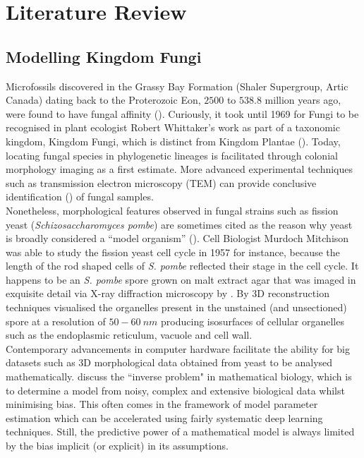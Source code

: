 \chapter{Literature Review}

\section{Modelling Kingdom Fungi}

Microfossils discovered in the Grassy Bay Formation 
(Shaler Supergroup, Artic Canada) dating back to the Proterozoic Eon, $2500$ to $538.8$ million years ago, were 
found to have fungal affinity (\cite{loron2019early}). Curiously, it took until 1969 for Fungi to be 
recognised in plant ecologist Robert Whittaker's work as part of a taxonomic kingdom, Kingdom Fungi,
which is distinct from Kingdom Plantae (\cite{whittaker1969new}). Today, locating fungal species 
in phylogenetic lineages is facilitated through colonial morphology imaging as a first 
estimate. More advanced experimental techniques such as transmission 
electron microscopy (TEM) can provide  
conclusive identification (\cite{loron2019early}) of fungal samples.
\\

Nonetheless, morphological features observed in fungal strains such as fission yeast 
(\textit{Schizosaccharomyces pombe}) are sometimes cited as the reason 
why yeast is broadly considered a ``model organism'' (\cite{hayles2018introduction}).
Cell Biologist Murdoch Mitchison was able to study the fission yeast cell cycle in 1957 for instance,
because the length of the rod shaped cells of \textit{S. pombe} reflected their stage in the cell cycle.
It happens to be an \textit{S. pombe} spore grown on malt extract agar that was imaged in exquisite detail via 
X-ray diffraction microscopy by \cite{jiang2010quantitative}. By 3D 
reconstruction techniques \cite{jiang2010quantitative} visualised the organelles
present in the unstained (and unsectioned) spore at a resolution of $50-60 \ nm$ 
producing isosurfaces of cellular organelles such as the endoplasmic reticulum, 
vacuole and cell wall.
\\

Contemporary advancements in computer hardware facilitate 
the ability for big datasets such as 3D morphological data 
obtained from yeast to be analysed mathematically. \cite{clermont2015inverse} 
discuss the ``inverse problem" in mathematical biology, which is to determine a model 
from noisy, complex and extensive biological data whilst minimising bias. This often 
comes in the framework of model parameter estimation which 
can be accelerated using fairly systematic deep learning techniques. Still, the predictive power
of a mathematical model is always limited by the bias implicit (or explicit) in its assumptions.
\\

